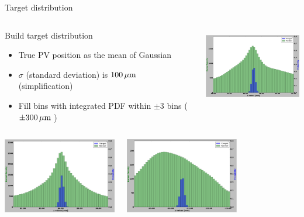 \begin{frame}{Target distribution}
\vspace{-.8cm}
\begin{columns}[c]
    \begin{block}{Build target distribution}
      \begin{itemize}
          \item True PV position as the mean of Gaussian
          \item $\sigma$ (standard deviation) is $\unit[100]{\mu m}$ (simplification)
          \item Fill bins with integrated PDF within $\pm 3$ bins ($\pm \unit[300]{\mu m}$ )
      \end{itemize}
    \end{block}
      \begin{center}
    \includegraphics[height=3.3cm, trim=18 0 18 0]{images/T_1_25.png}
  \end{center}
  \end{columns}
  \vspace{-.5cm}
  \begin{columns}
      \begin{center}
        \includegraphics[height=3.3cm,trim=18 0 18 0]{images/T_2_25.png}
      \end{center}
      \begin{center}
        \includegraphics[height=3.3cm,trim=18 0 18 0]{images/T_3_25.png}

\end{center}
\end{columns}
\end{frame}
